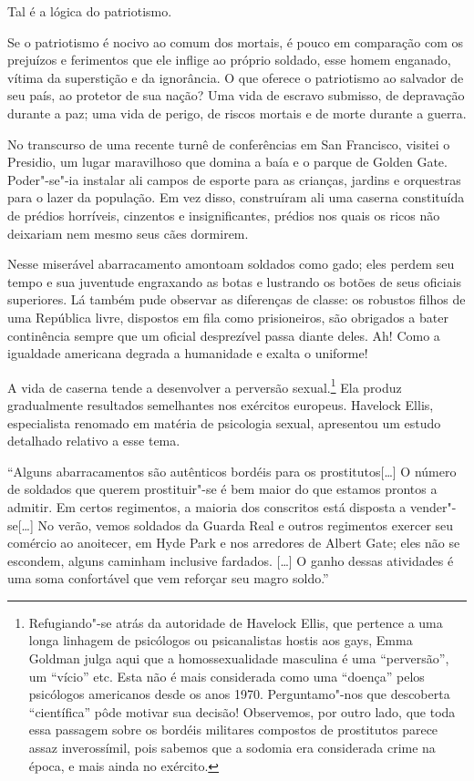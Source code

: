 Tal é a lógica do patriotismo.

Se o patriotismo é nocivo ao comum dos mortais, é pouco em comparação
com os prejuízos e ferimentos que ele inflige ao próprio soldado, esse
homem enganado, vítima da superstição e da ignorância. O que oferece o
patriotismo ao salvador de seu país, ao protetor de sua nação? Uma vida
de escravo submisso, de depravação durante a paz; uma vida de perigo,
de riscos mortais e de morte durante a guerra.

No transcurso de uma recente turnê de conferências em San Francisco,
visitei o Presidio, um lugar maravilhoso que domina a baía e o parque
de Golden Gate. Poder"-se"-ia instalar ali campos de esporte para as
crianças, jardins e orquestras para o lazer da população. Em vez disso,
construíram ali uma caserna constituída de prédios horríveis, cinzentos
e insignificantes, prédios nos quais os ricos não deixariam nem mesmo
seus cães dormirem.

Nesse miserável abarracamento amontoam soldados como gado; eles perdem
seu tempo e sua juventude engraxando as botas e lustrando os botões de
seus oficiais superiores. Lá também pude observar as diferenças de
classe: os robustos filhos de uma República livre, dispostos em fila
como prisioneiros, são obrigados a bater continência sempre 
que um oficial desprezível passa diante deles. Ah! Como a igualdade americana 
degrada a humanidade e exalta o uniforme!

A vida de caserna tende a desenvolver a perversão sexual.\footnote{ 
Refugiando"-se atrás da autoridade de Havelock Ellis, que pertence a
uma longa linhagem de psicólogos ou psicanalistas hostis aos gays, Emma
Goldman julga aqui que a homossexualidade masculina é uma “perversão”,
um “vício” etc. Esta não é mais considerada como uma “doença” pelos psicólogos
americanos desde os anos 1970. Perguntamo"-nos que descoberta
“científica” pôde motivar sua decisão! Observemos, por outro lado, que
toda essa passagem sobre os bordéis militares compostos de prostitutos
parece assaz inverossímil, pois sabemos que a sodomia era considerada
crime na época, e mais ainda no exército.} Ela produz
gradualmente resultados semelhantes nos exércitos europeus. Havelock
Ellis, especialista renomado em matéria de psicologia sexual,
apresentou um estudo detalhado relativo a esse tema.

“Alguns abarracamentos são autênticos bordéis para os prostitutos[\ldots] O
número de soldados que querem prostituir"-se é bem maior do que
estamos prontos a admitir. Em certos regimentos, a maioria dos
conscritos está disposta a vender"-se[\ldots] No verão, vemos soldados da
Guarda Real e outros regimentos exercer seu comércio ao anoitecer, em
Hyde Park e nos arredores de Albert Gate; eles não se escondem, alguns
caminham inclusive fardados. [\ldots] O ganho dessas atividades é uma soma
confortável que vem reforçar seu magro soldo.”

